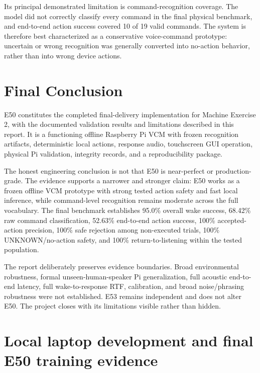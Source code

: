 \documentclass[11pt]{article}
\begin{document}
Its principal demonstrated limitation is command-recognition coverage. The model did not correctly classify every command in the final physical benchmark, and end-to-end action success covered 10 of 19 valid commands. The system is therefore best characterized as a conservative voice-command prototype: uncertain or wrong recognition was generally converted into no-action behavior, rather than into wrong device actions.

\newpage
\section{Final Conclusion}

E50 constitutes the completed final-delivery implementation for Machine Exercise 2, with the documented validation results and limitations described in this report. It is a functioning offline Raspberry Pi VCM with frozen recognition artifacts, deterministic local actions, response audio, touchscreen GUI operation, physical Pi validation, integrity records, and a reproducibility package.

The honest engineering conclusion is not that E50 is near-perfect or production-grade. The evidence supports a narrower and stronger claim: E50 works as a frozen offline VCM prototype with strong tested action safety and fast local inference, while command-level recognition remains moderate across the full vocabulary. The final benchmark establishes 95.0\% overall wake success, 68.42\% raw command classification, 52.63\% end-to-end action success, 100\% accepted-action precision, 100\% safe rejection among non-executed trials, 100\% UNKNOWN/no-action safety, and 100\% return-to-listening within the tested population.

The report deliberately preserves evidence boundaries. Broad environmental robustness, formal unseen-human-speaker Pi generalization, full acoustic end-to-end latency, full wake-to-response RTF, calibration, and broad noise/phrasing robustness were not established. E53 remains independent and does not alter E50. The project closes with its limitations visible rather than hidden.

\section{Local laptop development and final E50 training evidence}
\end{document}
